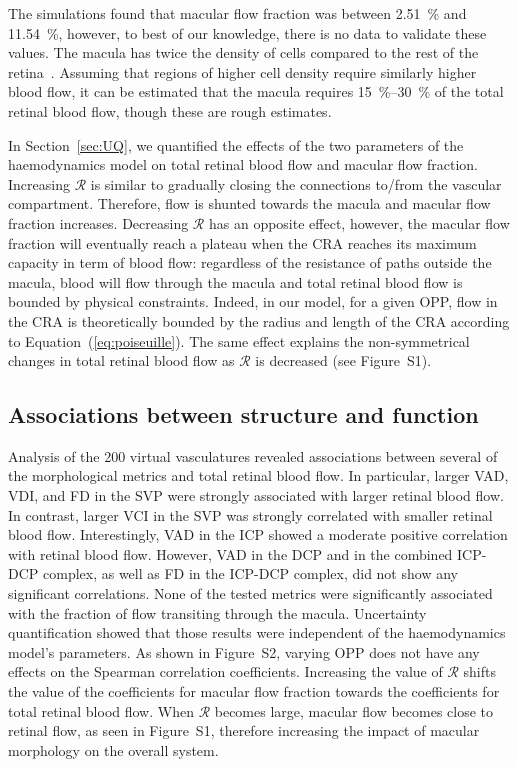 \documentclass[11pt,]{article}
\begin{document}
The simulations found that macular flow fraction was between \SI{2.51}{\percent} and \SI{11.54}{\percent}, however, to best of our knowledge, there is no data to validate these values.
The macula has twice the density of cells compared to the rest of the retina~\cite{Zouache2022}.
Assuming that regions of higher cell density require similarly higher blood flow, it can be estimated that the macula requires \SIrange{15}{30}{\percent} of the total retinal blood flow, though these are rough estimates.

In Section~\ref{sec:UQ}, we quantified the effects of the two parameters of the haemodynamics model on total retinal blood flow and macular flow fraction.
Increasing $\mathcal R$ is similar to gradually closing the connections to/from the vascular compartment.
Therefore, flow is shunted towards the macula and macular flow fraction increases.
Decreasing $\mathcal R$ has an opposite effect, however, the macular flow fraction will eventually reach a plateau when the CRA reaches its maximum capacity in term of blood flow: regardless of the resistance of paths outside the macula, blood will flow through the macula and total retinal blood flow is bounded by physical constraints.
Indeed, in our model, for a given OPP, flow in the CRA is theoretically bounded by the radius and length of the CRA according to Equation~(\ref{eq:poiseuille}).
The same effect explains the non-symmetrical changes in total retinal blood flow as $\mathcal R$ is decreased (see Figure~S1). %

\subsection{Associations between structure and function}\label{sec:disc-results}

Analysis of the \SI{200}{} virtual vasculatures revealed associations between several of the morphological metrics and total retinal blood flow.
In particular, larger VAD, VDI, and FD in the SVP were strongly associated with larger retinal blood flow.
In contrast, larger VCI in the SVP was strongly correlated with smaller retinal blood flow.
Interestingly, VAD in the ICP showed a moderate positive correlation with retinal blood flow.
However, VAD in the DCP and in the combined ICP-DCP complex, as well as FD in the ICP-DCP complex, did not show any significant correlations.
None of the tested metrics were significantly associated with the fraction of flow transiting through the macula.
Uncertainty quantification showed that those results were independent of the haemodynamics model's parameters.
As shown in Figure~S2, varying OPP does not have any effects on the Spearman correlation coefficients.
Increasing the value of $\mathcal R$ shifts the value of the coefficients for macular flow fraction towards the coefficients for total retinal blood flow.
When $\mathcal R$ becomes large, macular flow becomes close to retinal flow, as seen in Figure~S1, therefore increasing the impact of macular morphology on the overall system. 
\end{document}
